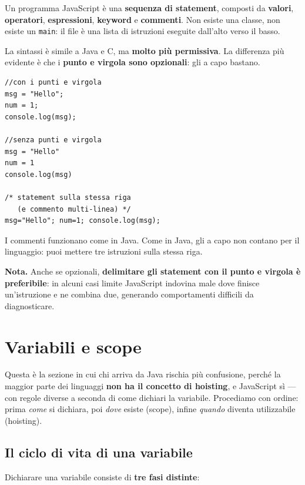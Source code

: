 \documentclass[10pt,a4paper]{article}
\newcommand{\nota}[1]{\textbf{\textcolor{ngreen}{Nota.}} #1}
\begin{document}
Un programma JavaScript è una \textbf{sequenza di statement}, composti da \textbf{valori}, \textbf{operatori}, \textbf{espressioni}, \textbf{keyword} e \textbf{commenti}. Non esiste una classe, non esiste un \texttt{main}: il file è una lista di istruzioni eseguite dall'alto verso il basso.

La sintassi è simile a Java e C, ma \textbf{molto più permissiva}. La differenza più evidente è che i \textbf{punto e virgola sono opzionali}: gli a capo bastano.

\begin{lstlisting}[style=js]
//con i punti e virgola
msg = "Hello";
num = 1;
console.log(msg);

//senza punti e virgola
msg = "Hello"
num = 1
console.log(msg)

/* statement sulla stessa riga
   (e commento multi-linea) */
msg="Hello"; num=1; console.log(msg);
\end{lstlisting}

I commenti funzionano come in Java. Come in Java, gli a capo non contano per il linguaggio: puoi mettere tre istruzioni sulla stessa riga.

\begin{notebox}
\nota{Anche se opzionali, \textbf{delimitare gli statement con il punto e virgola è preferibile}: in alcuni casi limite JavaScript indovina male dove finisce un'istruzione e ne combina due, generando comportamenti difficili da diagnosticare.}
\end{notebox}

\section{Variabili e scope}

Questa è la sezione in cui chi arriva da Java rischia più confusione, perché la maggior parte dei linguaggi \textbf{non ha il concetto di hoisting}, e JavaScript sì --- con regole diverse a seconda di come dichiari la variabile. Procediamo con ordine: prima \emph{come} si dichiara, poi \emph{dove} esiste (scope), infine \emph{quando} diventa utilizzabile (hoisting).

\subsection{Il ciclo di vita di una variabile}

Dichiarare una variabile consiste di \textbf{tre fasi distinte}:
\end{document}
